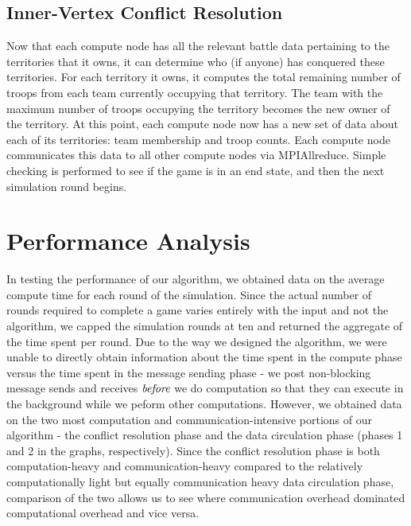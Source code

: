 \documentclass[10pt]{article}
\begin{document}
\begin{multicols}{2}
		\subsection*{Inner-Vertex Conflict Resolution}

		Now that each compute node has all the relevant battle data pertaining to the territories that it owns, it can determine who (if anyone) has conquered these territories. 
		For each territory it owns, it computes the total remaining number of troops from each team currently occupying that territory.
		The team with the maximum number of troops occupying the territory becomes the new owner of the territory. 
		At this point, each compute node now has a new set of data about each of its territories: team membership and troop counts. 
		Each compute node communicates this data to all other compute nodes via MPIAllreduce. 
		Simple checking is performed to see if the game is in an end state, and then the next simulation round begins.

		
		\section*{Performance Analysis}
		In testing the performance of our algorithm, we obtained data on the average compute time for each round of the simulation. 
		Since the actual number of rounds required to complete a game varies entirely with the input and not the algorithm, we capped the simulation rounds at ten and returned the aggregate of the time spent per round. 
		Due to the way we designed the algorithm, we were unable to directly obtain information about the time spent in the compute phase versus the time spent in the message sending phase - we post non-blocking message sends and receives $\emph{before}$ we do computation so that they can execute in the background while we peform other computations.
		However, we obtained data on the two most computation and communication-intensive portions of our algorithm - the conflict resolution phase and the data circulation phase (phases 1 and 2 in the graphs, respectively). 
		Since the conflict resolution phase is both computation-heavy and communication-heavy compared to the relatively computationally light but equally communication heavy data circulation phase, comparison of the two allows us to see where communication overhead dominated computational overhead and vice versa. 

\end{multicols}
\end{document}
